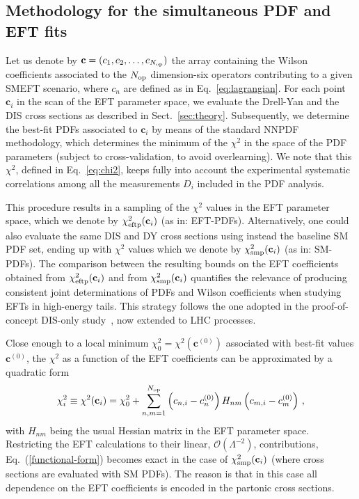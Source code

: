 \documentclass[withindex,glossary]{cam-thesis}
\begin{document}
\subsection{Methodology for the simultaneous PDF and EFT fits}
\label{eq:jointfits}

Let us denote by ${\mathbf{c}}=(c_1,c_2,\ldots,c_{N_{\rm op}})$ the array containing
the Wilson coefficients associated to the $N_{\rm op}$ dimension-six
operators contributing to a given SMEFT scenario, where $c_n$ are
defined as in Eq.~\eqref{eq:lagrangian}. 
For each point ${\mathbf{c}_i}$ in the scan of the EFT parameter space, we evaluate
the Drell-Yan and the DIS cross sections as described in Sect.~\ref{sec:theory}.
%
Subsequently, we determine the best-fit
PDFs associated to ${\mathbf{c}_i}$ by means of the standard NNPDF methodology, which
determines the minimum of the $\chi^2$ in the space of the PDF
parameters (subject to cross-validation, to avoid overlearning).
%
We note that this $\chi^2$, defined in
Eq.~\eqref{eq:chi2}, keeps fully into account the experimental
systematic correlations among all the
measurements $D_i$ included in the PDF analysis. 

This procedure results in a sampling of the $\chi^2$ values
in the EFT parameter space, which we denote by $\chi_{\rm eftp}^2({\mathbf{c}_i})$
(as in: EFT-PDFs).
%
Alternatively, one could also evaluate the same DIS and DY cross sections using instead
the baseline SM PDF set, ending up with  $\chi^2$ values which we denote by $\chi_{\rm smp}^2({\mathbf{c}_i})$
(as in: SM-PDFs).
%
The comparison between the resulting bounds on the EFT coefficients
obtained  from 
$\chi_{\rm eftp}^2({\mathbf{c}_i})$
and from $\chi_{\rm smp}^2({\mathbf{c}_i})$ quantifies the relevance of
producing consistent joint determinations of PDFs and Wilson coefficients
when studying EFTs in high-energy tails.
%
This strategy follows the one adopted in the proof-of-concept DIS-only
study~\cite{Carrazza:2019sec}, now extended to LHC processes.

Close enough to a local minimum $\chi_0^2=\chi^2\left( \mathbf{c}^{(0)}\right)$ associated with best-fit values $\mathbf{c}^{(0)}$,
the $\chi^2$ as a function of the EFT coefficients can be approximated by a quadratic form
\begin{equation}
\label{functional-form}
\chi_i^2 \equiv \chi^2(\mathbf{c}_i) = \chi_0^2 +
\sum_{n,m=1}^{N_{\rm op}}\left( c_{n,i} - c^{(0)}_n\right)  H_{nm} 
    \left( c_{m,i} - c^{(0)}_m\right)\, ,
\end{equation}
with $H_{nm}$ being the usual Hessian matrix in the EFT parameter space.
%
Restricting the EFT calculations to their linear, $\mathcal{O}\left( \Lambda^{-2}\right)$, contributions, Eq.~(\ref{functional-form})
becomes exact
in the case of $\chi_{\rm smp}^2({\mathbf{c}_i})$ (where cross sections are
evaluated with SM PDFs).
%
The reason is that in this case
all dependence on the EFT coefficients is encoded in the partonic cross sections.
\end{document}
